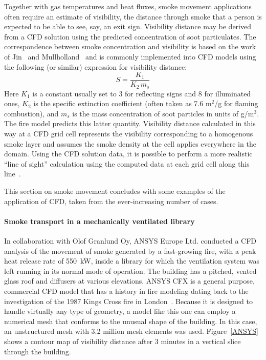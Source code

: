 \documentclass[graybox]{svmult}
\begin{document}
Together with gas temperatures and heat fluxes, smoke movement applications often require an estimate of visibility, the distance through smoke that a person is expected to be able to see, say, an exit sign. Visibility distance may be derived from a CFD solution using the predicted concentration of soot particulates. The correspondence between smoke concentration and visibility is based on the work of Jin~\cite{Jin} and Mullholland~\cite{Mulholland} and is commonly implemented into CFD models using the following (or similar) expression for visibility distance:
\begin{equation}
S = \frac{K_1}{K_2 \, m_s}
\label{eq:vis}
\end{equation}
Here $K_1$ is a constant usually set to 3 for reflecting signs and 8 for illuminated ones, $K_2$ is the specific extinction coefficient (often taken as 7.6 m$^2$/g for flaming combustion), and $m_s$ is the mass concentration of soot particles in units of g/m$^3$.  The fire model predicts this latter quantity. Visibility distance calculated in this way at a CFD grid cell represents the visibility corresponding to a homogenous smoke layer and assumes the smoke density at the cell applies everywhere in the domain. Using the CFD solution data, it is possible to perform a more realistic ``line of sight'' calculation using the computed data at each grid cell along this line~\cite{Husted}.

This section on smoke movement concludes with some examples of the application of CFD, taken from the ever-increasing number of cases.

\paragraph{Smoke transport in a mechanically ventilated library}

In collaboration with Olof Granlund Oy, ANSYS Europe Ltd. conducted a CFD analysis of the movement of smoke generated by a fast-growing fire, with a peak heat release rate of 550~kW, inside a library for which the ventilation system was left running in its normal mode of operation. The building has a pitched, vented glass roof and diffusers at various elevations. ANSYS CFX is a general purpose, commercial CFD model that has a history in fire modeling dating back to the investigation of the 1987 Kings Cross fire in London~\cite{Simcox}. Because it is designed to handle virtually any type of geometry, a model like this one can employ a numerical mesh that conforms to the unusual shape of the building. In this case, an unstructured mesh with 3.2 million mesh elements was used. Figure~\ref{ANSYS} shows a contour map of visibility distance after
3 minutes in a vertical slice through the building.
\end{document}
